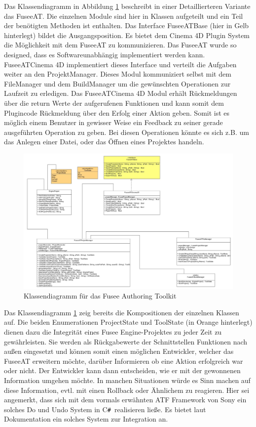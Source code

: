 \documentclass[pagesize, paper=a4, fontsize=12pt, titlepage=true, headings=small, headnosepline, abstractoff, liststotoc, nochapterprefix, plainheadsepline, twoside]{scrreprt}
\newcommand{\CSS}{C\texttt{\# }}
\begin{document}
Das Klassendiagramm in Abbildung \ref{FuseeATKlassendiagramm} beschreibt in einer Detaillierteren Variante das FuseeAT. Die einzelnen Module sind hier in Klassen aufgeteilt und ein Teil der benötigten Methoden ist enthalten. Das Interface FuseeATBase (hier in Gelb hinterlegt) bildet die Ausgangsposition. Es bietet dem Cinema 4D Plugin System die Möglichkeit mit dem FuseeAT zu kommunizieren. Das FuseeAT wurde so designed, dass es Softwareunabhängig implementiert werden kann. FuseeATCinema 4D implementiert dieses Interface und verteilt die Aufgaben weiter an den ProjektManager. Dieses Modul kommuniziert selbst mit dem FileManager und dem BuildManager um die gewünschten Operationen zur Laufzeit zu erledigen. Das FuseeATCinema 4D Modul erhält Rückmeldungen über die return Werte der aufgerufenen Funktionen und kann somit dem Plugincode Rückmeldung über den Erfolg einer Aktion geben. Somit ist es möglich einem Benutzer in gewisser Weise ein Feedback zu seiner gerade ausgeführten Operation zu geben. Bei diesen Operationen könnte es sich z.B. um das Anlegen einer Datei, oder das Öffnen eines Projektes handeln.
\begin{figure}[ht]
	\centering
	\includegraphics[width=\linewidth]{Bilder/Klassendiagramm_FuseeAT.jpg}
	\caption{Klassendiagramm für das Fusee Authoring Toolkit}
	\label{FuseeATKlassendiagramm}
\end{figure}
Das Klassendiagramm \ref{FuseeATKlassendiagramm} zeig bereits die Kompositionen der einzelnen Klassen auf. Die beiden Enumerationen ProjectState und ToolState (in Orange hinterlegt) dienen dazu die Integrität eines Fusee Engine-Projektes zu jeder Zeit zu gewährleisten. Sie werden als Rückgabewerte der Schnittstellen Funktionen nach außen eingesetzt und können somit einen möglichen Entwickler, welcher das FuseeAT erweitern möchte, darüber Informieren ob eine Aktion erfolgreich war oder nicht. Der Entwickler kann dann entscheiden, wie er mit der gewonnenen Information umgehen möchte. In manchen Situationen würde es Sinn machen auf diese Information, evtl. mit einen Rollback oder Ähnlichem zu reagieren. Hier sei angemerkt, dass sich mit dem vormals erwähnten ATF Framework von Sony ein solches Do und Undo System in \CSS realisieren ließe. Es bietet laut Dokumentation ein solches System zur Integration an.
\end{document}

